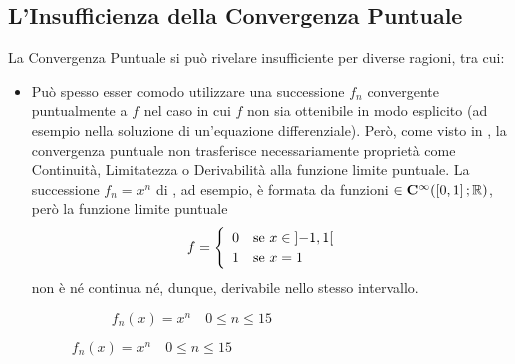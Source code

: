 \subsection{L'Insufficienza della Convergenza Puntuale}\label{sect:insuff_conv_punt}
La Convergenza Puntuale si può rivelare insufficiente per diverse ragioni, tra cui:
\begin{itemize}
	\item
		Può spesso esser comodo utilizzare una successione $f_n$ convergente puntualmente a $f$ nel caso in cui $f$ non sia ottenibile in modo esplicito (ad esempio nella soluzione di un'equazione differenziale). Però, come visto in , la convergenza puntuale non trasferisce necessariamente proprietà come Continuità, Limitatezza o Derivabilità alla funzione limite puntuale.
		La successione $f_n = x^n$ di , ad esempio, è formata da funzioni $\in \mathbf{C^{\infty}}(\left[0,1\right]; \mathbb{R})$, però la funzione limite puntuale
		\[
			f =
			\begin{cases}
				\begin{array}{ll}
					0 & \text{se } x \in \left]-1,1\right[\\
					1 & \text{se } x = 1
				\end{array}
			\end{cases}
		\]
		non è né continua né, dunque, derivabile nello stesso intervallo.
		\begin{figure}[H]
			\begin{subfigure}{.49\textwidth}
				\centering
				\caption{$f_n(x) = x^n \quad 0 \leq n \leq 15$}
			\end{subfigure}

\end{figure}
\end{itemize}
